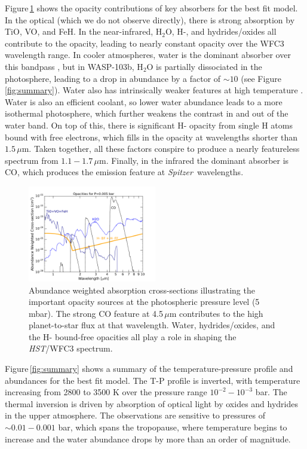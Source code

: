 \documentclass[twocolumn]{aastex61}
\newcommand{\project}[1]{\textsl{#1}}
\newcommand{\HST}{\project{HST}}
\newcommand{\Spitzer}{\project{Spitzer}}
\begin{document}
Figure\,\ref{fig:opacities} shows the opacity contributions of key absorbers for the best fit model.  In the optical (which we do not observe directly), there is strong absorption by TiO, VO, and FeH.  In the near-infrared, H$_2$O, H-, and hydrides/oxides all contribute to the opacity, leading to nearly constant opacity over the WFC3 wavelength range.  In cooler atmospheres, water is the dominant absorber over this bandpass \citep[e.g.][]{kreidberg14b, line16}, but in WASP-103b, H$_2$O is partially dissociated in the photosphere, leading to a drop in abundance by a factor of $\sim10$ (see Figure\,\ref{fig:summary}). Water also has intrinsically weaker features at high temperature \citep{tinetti12}. Water is also an efficient coolant, so lower water abundance leads to a more isothermal photosphere, which further weakens the contrast in and out of the water band. On top of this, there is significant H- opacity from single H atoms bound with free electrons, which fills in the opacity at wavelengths shorter than $1.5\,\mu$m.  Taken together, all these factors conspire to produce a nearly featureless spectrum from $1.1 - 1.7\,\mu$m. Finally, in the infrared the dominant absorber is CO, which produces the emission feature at \Spitzer\ wavelengths.  

\begin{figure}
\includegraphics[width = 0.5\textwidth]{Figures/xsec_FULL.pdf}
\caption{Abundance weighted absorption cross-sections illustrating the important opacity sources at the photospheric pressure level (5 mbar). The strong CO feature at 4.5\,$\mu$m contributes to the high planet-to-star flux at that wavelength.  Water, hydrides/oxides, and the H- bound-free opacities all play a role in shaping the \HST/WFC3 spectrum.}
\label{fig:opacities}
\end{figure}

Figure\,\ref{fig:summary} shows a summary of the temperature-pressure profile and abundances for the best fit model. The T-P profile is inverted, with temperature increasing from 2800 to 3500 K over the pressure range $10^{-2} - 10^{-3}$ bar.  The  thermal inversion is driven by absorption of optical light by oxides and hydrides in the upper atmosphere.  The observations are sensitive to pressures of $\sim0.01 - 0.001$ bar, which spans the tropopause, where temperature begins to increase and the water abundance drops by more than an order of magnitude.
\end{document}
